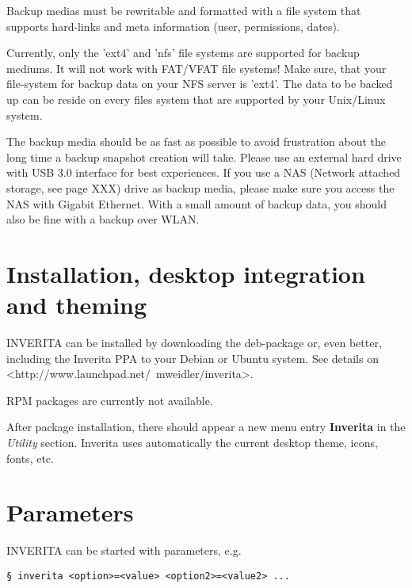 Backup medias must be rewritable and formatted with a file system that supports
hard-links and meta information (user, permissions, dates).

\begin{warning}
Currently, only the 'ext4' and 'nfs' file systems are supported for backup mediums.
It will not work with FAT/VFAT file systems!
Make sure, that your file-system for backup data on your NFS server is 'ext4'.
The data to be backed up can be reside on every files system that are supported
by your Unix/Linux system.
\end{warning}

The backup media should be as fast as possible to avoid frustration about the
long time a backup snapshot creation will take. Please use an external hard drive
with USB 3.0 interface for best experiences. If you use a NAS (Network attached storage,
see page XXX) drive as backup media, please make sure you access the NAS with Gigabit
Ethernet. With a small amount of backup data, you should also be fine with a backup
over WLAN.


\section{Installation, desktop integration and theming}
INVERITA can be installed by downloading the deb-package or, even better,
including the Inverita PPA to your Debian or Ubuntu system. See details on <http://www.launchpad.net/~mweidler/inverita>.

RPM packages are currently not available.

After package installation, there should appear a new menu entry \textbf{Inverita} in the
\textit{Utility} section. Inverita uses automatically the current desktop theme, icons,
fonts, etc.


\section{Parameters}
INVERITA can be started with parameters, e.g.

\begin{lstlisting}[style=console]
§ inverita <option>=<value> <option2>=<value2> ...
\end{lstlisting}

